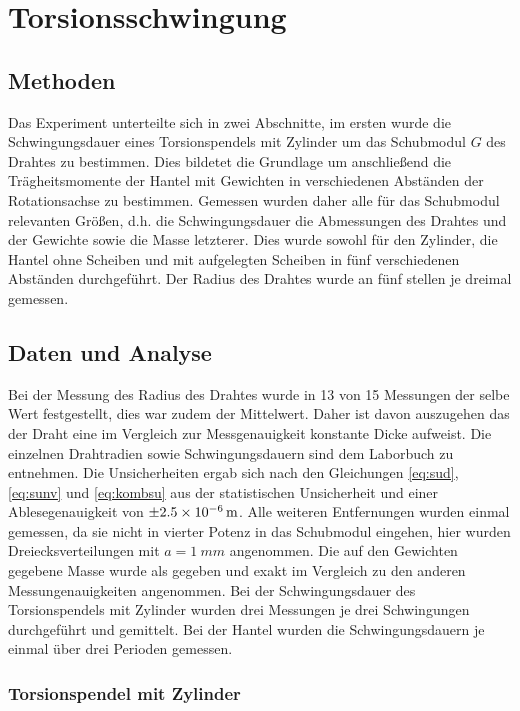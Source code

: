 
\section{Torsionsschwingung}


\subsection{Methoden}
Das Experiment unterteilte sich in zwei Abschnitte, im ersten wurde die Schwingungsdauer eines Torsionspendels mit Zylinder um das Schubmodul $G$ des Drahtes zu bestimmen. Dies bildetet die Grundlage um anschließend die Trägheitsmomente der Hantel mit Gewichten in verschiedenen Abständen der Rotationsachse zu bestimmen.
Gemessen wurden daher alle für das Schubmodul relevanten Größen, d.h. die Schwingungsdauer die Abmessungen des Drahtes und der Gewichte sowie die Masse letzterer. Dies wurde sowohl für den Zylinder, die Hantel ohne Scheiben und mit aufgelegten Scheiben in fünf verschiedenen Abständen durchgeführt. Der Radius des Drahtes wurde an fünf stellen je dreimal gemessen.


\subsection{Daten und Analyse}
 Bei der Messung des Radius des Drahtes wurde in 13 von 15 Messungen der selbe Wert festgestellt, dies war zudem der Mittelwert. Daher ist davon auszugehen das der Draht eine im Vergleich zur Messgenauigkeit konstante Dicke aufweist. Die einzelnen Drahtradien sowie Schwingungsdauern sind dem Laborbuch zu entnehmen. Die Unsicherheiten ergab sich nach den Gleichungen \ref{eq:sud}, \ref{eq:sunv} und \ref{eq:kombsu} aus der statistischen Unsicherheit und einer Ablesegenauigkeit von $\SI{\pm 2.5e-6}{m}$.
 Alle weiteren Entfernungen wurden einmal gemessen, da sie nicht in vierter Potenz in das Schubmodul eingehen, hier wurden Dreiecksverteilungen mit $a=\SI{1}{mm}$ angenommen. Die auf den Gewichten gegebene Masse wurde als gegeben und exakt im Vergleich zu den anderen Messungenauigkeiten angenommen. Bei der Schwingungsdauer des Torsionspendels mit Zylinder wurden drei Messungen je drei Schwingungen durchgeführt und gemittelt. Bei der Hantel wurden die Schwingungsdauern je einmal über drei Perioden gemessen.\\
 
 
 \subsubsection*{Torsionspendel mit Zylinder}
 
